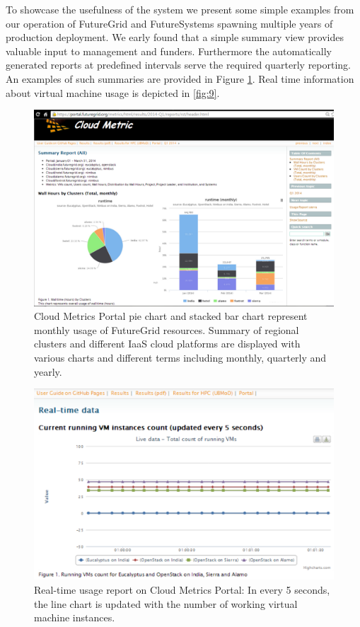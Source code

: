 \documentclass{sig-alternate-05-2015}
\begin{document}
To showcase the usefulness of the system we present some simple
examples from our operation of FutureGrid and FutureSystems spawning
multiple years of production deployment. We early found that a simple
summary view provides valuable input to management and funders.
Furthermore the automatically generated reports at predefined intervals
serve the required quarterly reporting. An examples of such summaries are
provided in Figure \ref{F:fig8}. Real time information about virtual
machine usage is depicted in \ref{fig:9}.

\begin{figure}[htb] 
  \centering 
    \includegraphics[width=1.0\columnwidth]{images/metrics-portal.pdf} 
  \caption{Cloud Metrics Portal pie chart and stacked bar chart represent monthly usage of FutureGrid resources. Summary of regional clusters and different IaaS cloud platforms are displayed with various charts and different terms including monthly, quarterly and yearly.}\label{F:fig8} 
\end{figure} 

\begin{figure}[htb] 
  \centering 
    \includegraphics[width=1.0\columnwidth]{images/metrics-portal-realtime.pdf} 
  \caption{Real-time usage report on Cloud Metrics Portal: In every 5 seconds, the line chart is updated with the number of working virtual machine instances.}\label{F:fig9} 
\end{figure} 
\end{document}
